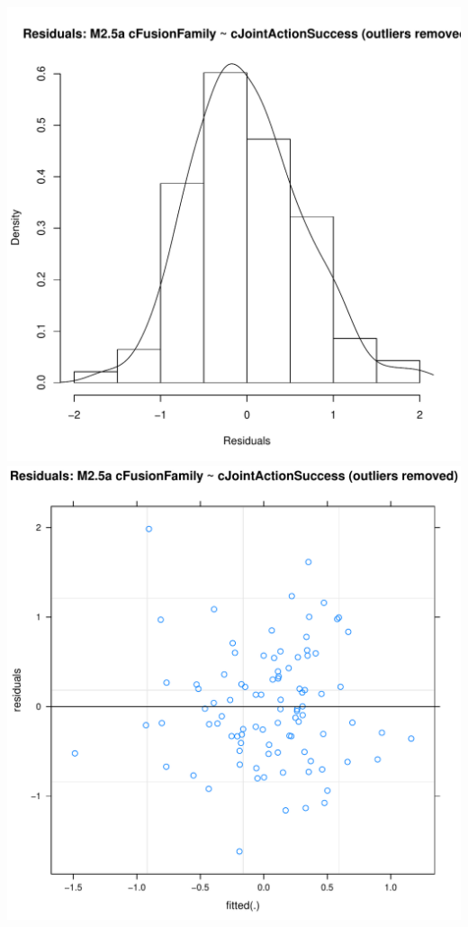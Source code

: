 \documentclass[12pt]{report}
\begin{document}
\newpage
\centering
\includegraphics[scale =.4]{../images/MLM25aOutHist.pdf}
\includegraphics[scale =.4]{../images/MLM25aOutScatter.pdf}
\end{document}
